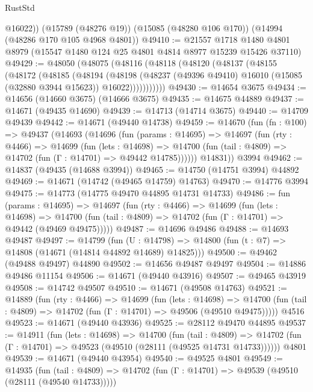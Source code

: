 \begin{lexlean}{RustStd}
\begin{coremodule}
        @16022))
    (@15789 (@48276 @19))
    (@15085 (@48280 @106 @170))
    (@14994 (@48286 @170 @105 @4968 @4801))
@49410 := @21557
    @1718
    @1480
    @4801
    @8979
    (@15547 @1480 @124 @25 @4801 @4814 @8977 @15239 @15426 @37110)
@49429 := @48050
    (@48075
      (@48116
        (@48118
          (@48120
            (@48137
              (@48155
                (@48172
                  (@48185
                    (@48194
                      (@48198
                        (@48237
                          (@49396 @49410)
                          @16010
                          (@15085 (@32880 @3944 @15623))
                          @16022)))))))))))
@49430 := @14654 @3675
@49434 := @14656 (@14660 @3675) (@14666 @3675)
@49435 := @14675 @44889
@49437 := @14671 (@49435 @14690)
@49439 := @14713 (@14714 @3675)
@49440 := @14709 @49439
@49442 := @14671 (@49440 @14738)
@49459 := @14670
    (fun (fn : @100) =>
    @49437
      (@14693
        (@14696
          (fun (params : @14695) =>
          @14697
            (fun (rty : @4466) =>
            @14699
              (fun (lets : @14698) =>
              @14700 (fun (tail : @4809) => @14702 (fun (Γ : @14701) => @49442 @14785))))))
        @14831))
    @3994
@49462 := @14837 (@49435 (@14688 @3994))
@49465 := @14750 (@14751 @3994) @44892
@49469 := @14671 (@14742 (@49465 @14759) @14763)
@49470 := @14776 @3994
@49475 := @14773 (@14775 @49470 @44895 @14731 @14733)
@49486 := fun (params : @14695) =>
  @14697
    (fun (rty : @4466) =>
    @14699
      (fun (lets : @14698) =>
      @14700 (fun (tail : @4809) => @14702 (fun (Γ : @14701) => @49442 (@49469 @49475)))))
@49487 := @14696 @49486
@49488 := @14693 @49487
@49497 := @14799
    (fun (U : @14798) => @14800 (fun (t : @7) => @14808 (@14671 (@14814 @44892 @14689) @14825)))
@49500 := @49462 (@49488 @49497) @44890
@49502 := @14656 @49487 @49497
@49504 := @14886 @49486 @11154
@49506 := @14671 (@49440 @43916)
@49507 := @49465 @43919
@49508 := @14742 @49507
@49510 := @14671 (@49508 @14763)
@49521 := @14889
    (fun (rty : @4466) =>
    @14699
      (fun (lets : @14698) =>
      @14700 (fun (tail : @4809) => @14702 (fun (Γ : @14701) => @49506 (@49510 @49475)))))
    @4516
@49523 := @14671 (@49440 @43936)
@49525 := @28112 @49470 @44895
@49537 := @14911
    (fun (lets : @14698) =>
    @14700
      (fun (tail : @4809) =>
      @14702 (fun (Γ : @14701) => @49523 (@49510 (@28111 (@49525 @14731 @14733))))))
    @4801
@49539 := @14671 (@49440 @43954)
@49540 := @49525 @4801
@49549 := @14935
    (fun (tail : @4809) => @14702 (fun (Γ : @14701) => @49539 (@49510 (@28111 (@49540 @14733)))))

\end{coremodule}
\end{lexlean}
